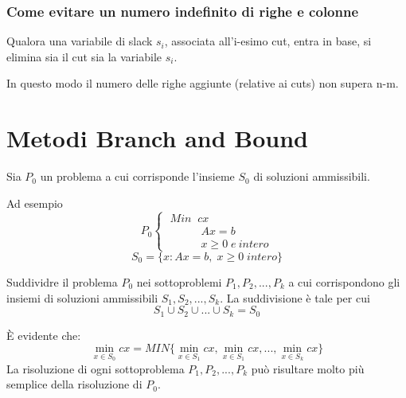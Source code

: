 \subsubsection{Come evitare un numero indefinito di righe e colonne}
Qualora una variabile di slack $s_{i}$, associata all'i-esimo cut, entra in base, si elimina sia il cut sia la variabile $s_{i}$.

In questo modo il numero delle righe aggiunte (relative ai cuts) non supera n-m.

\section{Metodi Branch and Bound}
Sia $P_{0}$ un problema a cui corrisponde l'insieme $S_{0}$ di soluzioni ammissibili.

Ad esempio
\begin{displaymath}
P_{0}
\begin{cases}
\;Min\;\;cx\\
\;\;\;\;\;\;\;\;\;\;\;A x = b\\
\;\;\;\;\;\;\;\;\;\;\;x \ge 0\;e\:intero
\end{cases}
\end{displaymath}
\begin{equation}
	S_{0}=\{x:Ax=b,\;x\ge 0\;intero\}
\end{equation}

Suddividre il problema $P_{0}$ nei sottoproblemi $P_{1},P_{2},...,P_{k}$ a cui corrispondono gli insiemi di soluzioni ammissibili $S_{1},S_{2},...,S_{k}$. La suddivisione è tale per cui 
\begin{equation}
S_{1} \cup S_{2} \cup ... \cup S_{k} = S_{0}
\end{equation}

È evidente che:
\begin{equation}
\min_{x \in S_{0}} cx = MIN\{\min_{x\in S_{1}} cx, \min_{x\in S_{1}}cx,...,\min_{x\in S_{k}}cx\}
\end{equation}
\noindent
La risoluzione di ogni sottoproblema $P_{1},P_{2},...,P_{k}$ può risultare molto più semplice della risoluzione di $P_{0}$.